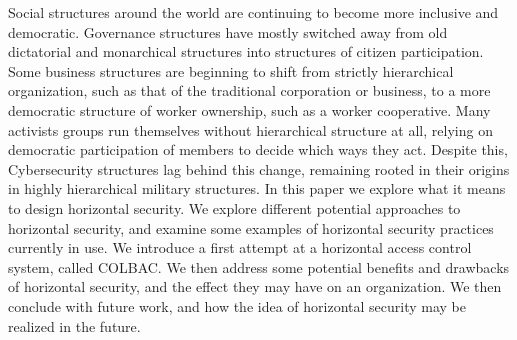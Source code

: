 Social structures around the world are continuing to become more inclusive and
democratic. Governance structures have mostly switched away from old dictatorial
and monarchical structures into structures of citizen participation. Some
business structures are beginning to shift from strictly hierarchical
organization, such as that of the traditional corporation or business, to a more
democratic structure of worker ownership, such as a worker cooperative. Many
activists groups run themselves without hierarchical structure at all, relying
on democratic participation of members to decide which ways they act. Despite
this, Cybersecurity structures lag behind this change, remaining rooted in their
origins in highly hierarchical military structures. In this paper we explore
what it means to design horizontal security. We explore different potential
approaches to horizontal security, and examine some examples of horizontal
security practices currently in use. We introduce a first attempt at a
horizontal access control system, called COLBAC. We then address some potential
benefits and drawbacks of horizontal security, and the effect they may have on
an organization. We then conclude with future work, and how the idea of
horizontal security may be realized in the future.
